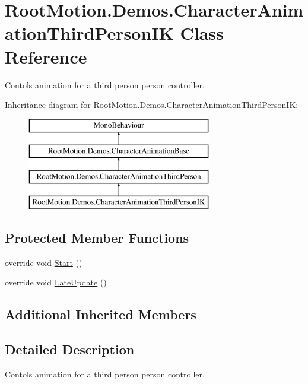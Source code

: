 \hypertarget{class_root_motion_1_1_demos_1_1_character_animation_third_person_i_k}{}\section{Root\+Motion.\+Demos.\+Character\+Animation\+Third\+Person\+IK Class Reference}
\label{class_root_motion_1_1_demos_1_1_character_animation_third_person_i_k}


Contols animation for a third person person controller.  


Inheritance diagram for Root\+Motion.\+Demos.\+Character\+Animation\+Third\+Person\+IK\+:\begin{figure}[H]
\begin{center}
\leavevmode
\includegraphics[height=4.000000cm]{class_root_motion_1_1_demos_1_1_character_animation_third_person_i_k}
\end{center}
\end{figure}
\subsection*{Protected Member Functions}
\begin{DoxyCompactItemize}
\item 
override void \mbox{\hyperlink{class_root_motion_1_1_demos_1_1_character_animation_third_person_i_k_a5af2e754eefe0eb694062fdc4ebcc0ee}{Start}} ()
\item 
override void \mbox{\hyperlink{class_root_motion_1_1_demos_1_1_character_animation_third_person_i_k_ab7032a39a642f6ac754d6ab4cf9bb342}{Late\+Update}} ()
\end{DoxyCompactItemize}
\subsection*{Additional Inherited Members}


\subsection{Detailed Description}
Contols animation for a third person person controller. 



